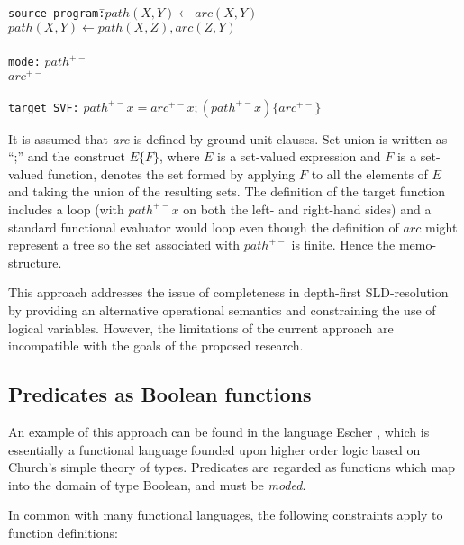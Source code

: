 \begin{tabbing}
\texttt{source program:}\quad\=$\mathit{path}(X, Y) \leftarrow \mathit{arc}(X,Y)$\\
\>                             $\mathit{path}(X, Y) \leftarrow \mathit{path}(X, Z),
				\mathit{arc}(Z, Y)$\\
\\
\texttt{mode:}\>               $\mathit{path}^{+-}$\\
\>                             $\mathit{arc}^{+-}$\\
\\
\texttt{target SVF:}\>         $\mathit{path}^{+-} x = \mathit{arc}^{+-} x;
				(\mathit{path}^{+-} x)\{\mathit{arc}^{+-}\}$
\end{tabbing}

It is assumed that \textit{arc} is defined by ground unit clauses.  Set union is written
as ``;'' and the construct $E\{F\}$, where $E$ is a set-valued expression and $F$ is a
set-valued function, denotes the set formed by applying $F$ to all the elements of $E$
and taking the union of the resulting sets.  The definition of the target function includes
a loop (with $path^{+-} x$ on both the left- and right-hand sides) and a standard functional
evaluator would loop even though the definition of $arc$ might represent a tree so the
set associated with $path^{+-}$ is finite.  Hence the memo-structure.

This approach addresses the issue of completeness in depth-first SLD-resolution by providing
an alternative operational semantics and constraining the use of logical variables.
However, the
limitations of the current approach are incompatible with the goals of the proposed research.

\subsection{Predicates as Boolean functions}

An example of this approach can be found in the language Escher \cite{Llo94},  which is
essentially a functional language
founded upon higher order logic based on Church's simple theory of types.  Predicates are
regarded as functions which map into the domain of type Boolean, and must be \textit{moded}.

In common with many functional languages, the following constraints apply to function
definitions:


